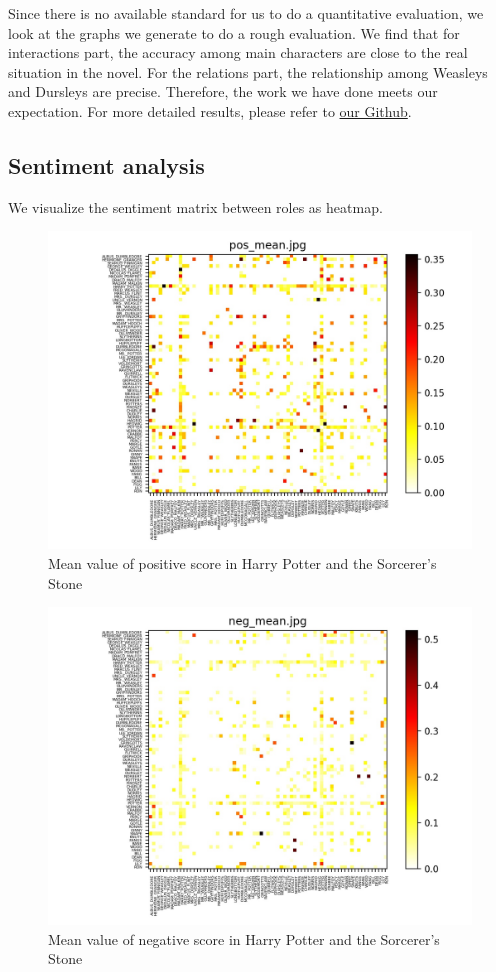 \documentclass[11pt]{article}
\begin{document}
    Since there is no available standard for us to do a quantitative evaluation, we look at the graphs we generate to do a rough evaluation. We find that for interactions part, the accuracy among main characters are close to the real situation in the novel. For the relations part, the relationship among Weasleys and Dursleys are precise. Therefore, the work we have done meets our expectation. For more detailed results, please refer to \href{github.io}{our Github}.

\subsection{Sentiment analysis}
    We visualize the sentiment matrix between roles as heatmap.
    \begin{figure}[H]
        \centering
        \includegraphics[width=\linewidth]{images/pos_mean.jpg}
        \caption{Mean value of positive score in Harry Potter and the Sorcerer's Stone}
    \end{figure}
    \begin{figure}[H]
        \centering
        \includegraphics[width=\linewidth]{images/neg_mean.jpg}
        \caption{Mean value of negative score in Harry Potter and the Sorcerer's Stone}
    \end{figure}
\end{document}
